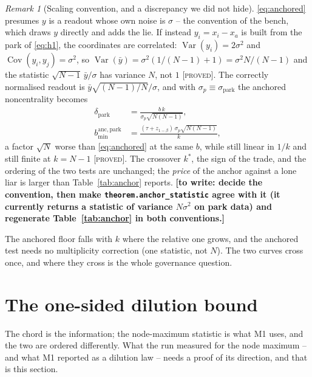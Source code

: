 \documentclass[10pt,twocolumn,a4paper]{article}
\newcommand{\proved}{\textcolor{teal!70!black}{\textsc{[proved]}}}
\newcommand{\gap}[1]{\textcolor{red!70!black}{\textbf{[to write: #1]}}}
\theoremstyle{definition}
\theoremstyle{remark}
\newtheorem{remark}[theorem]{Remark}
\newcommand{\bmin}{b_{\min}}
\newcommand{\taur}{\tau}
\begin{document}
\begin{remark}[Scaling convention, and a discrepancy we did not hide]
\label{rem:scaling}
\eqref{eq:anchored} presumes $y$ is a readout whose own noise is $\sigma$ --
the convention of the bench, which draws $y$ directly and adds the lie.
If instead $y_i=x_i-x_a$ is built from the park of \eqref{eq:h1}, the coordinates
are correlated: $\operatorname{Var}(y_i)=2\sigma^2$ and
$\operatorname{Cov}(y_i,y_j)=\sigma^2$, so
$\operatorname{Var}(\bar y)=\sigma^2(1/(N-1)+1)=\sigma^2N/(N-1)$ and the statistic
$\sqrt{N-1}\,\bar y/\sigma$ has variance $N$, not $1$ \proved. The correctly normalised readout is
$\bar y\sqrt{(N-1)/N}/\sigma$, and with $\sigma_p\equiv\sigma_{\mathrm{park}}$ the
anchored noncentrality becomes
\begin{equation}
\begin{aligned}
\delta_{\mathrm{park}}&=\frac{b\,k}{\sigma_p\sqrt{N(N-1)}},\\
\bmin^{\mathrm{anc,park}}&=\frac{({\taur}+z_{1-\beta})\,\sigma_p\sqrt{N(N-1)}}{k},
\end{aligned}
\label{eq:anchored-park}
\end{equation}
a factor $\sqrt{N}$ worse than \eqref{eq:anchored} at the same $b$, while still
linear in $1/k$ and still finite at $k=N-1$ \proved. The crossover $k^\ast$, the
sign of the trade, and the ordering of the two tests are unchanged; the
\emph{price} of the anchor against a lone liar is larger than
Table~\ref{tab:anchor} reports. \gap{decide the convention, then make
\texttt{theorem.anchor\_statistic} agree with it (it currently returns a statistic
of variance $N\sigma^2$ on park data) and regenerate Table~\ref{tab:anchor} in
both conventions.}
\end{remark}

The anchored floor falls with $k$ where the relative one grows, and the anchored
test needs no multiplicity correction (one statistic, not $N$). The two curves
cross once, and where they cross is the whole governance question.




\section{The one-sided dilution bound}
\label{sec:bound}

The chord is the information; the node-maximum statistic is what M1 uses, and the
two are ordered differently. What the run measured for the node maximum -- and
what M1 reported as a dilution law -- needs a proof of its direction, and that is
this section.
\end{document}
